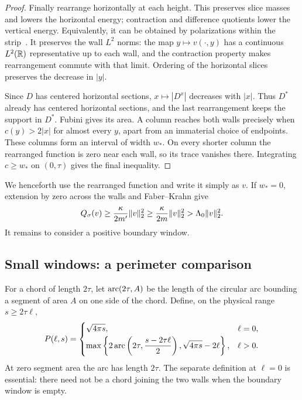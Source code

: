 \begin{proof}
Finally rearrange horizontally at each height. This preserves slice masses and lowers the horizontal energy; contraction and difference quotients lower the vertical energy. Equivalently, it can be obtained by polarizations within the strip~\cite{BrockSolynin}. It preserves the wall $L^2$ norms: the map $y\mapsto v(\cdot,y)$ has a continuous $L^2(\mathbb R)$ representative up to each wall, and the contraction property makes rearrangement commute with that limit. Ordering of the horizontal slices preserves the decrease in $|y|$.

Since $D$ has centered horizontal sections, $x\mapsto |D^x|$ decreases with $|x|$. Thus $D^*$ already has centered horizontal sections, and the last rearrangement keeps the support in $D^*$. Fubini gives its area. A column reaches both walls precisely when $c(y)>2|x|$ for almost every $y$, apart from an immaterial choice of endpoints. These columns form an interval of width $w_*$. On every shorter column the rearranged function is zero near each wall, so its trace vanishes there. Integrating $c\ge w_*$ on $(0,\tau)$ gives the final inequality.
\end{proof}

We henceforth use the rearranged function and write it simply as $v$.
If $w_*=0$, extension by zero across the walls and Faber--Krahn give
\[
 Q_\sigma(v)\ge\frac\kappa{2m'}\lVert v\rVert_2^2
 \ge\frac\kappa{2m}\lVert v\rVert_2^2>\Lambda_0\lVert v\rVert_2^2.
\]
It remains to consider a positive boundary window.

\subsection{Small windows: a perimeter comparison}
For a chord of length $2\tau$, let $\operatorname{arc}(2\tau,A)$ be the length of the circular arc bounding a segment of area $A$ on one side of the chord. Define, on the physical range $s\ge2\tau\ell$,
\begin{equation}\label{eq:perimeter}
 P(\ell,s)=
 \begin{cases}
 \sqrt{4\pi s},&\ell=0,\\[2pt]
 \displaystyle\max\left\{2\operatorname{arc}\left(2\tau,\frac{s-2\tau\ell}{2}\right),
                      \sqrt{4\pi s}-2\ell\right\},&\ell>0.
 \end{cases}
\end{equation}
At zero segment area the arc has length $2\tau$. The separate definition at $\ell=0$ is essential: there need not be a chord joining the two walls when the boundary window is empty.

